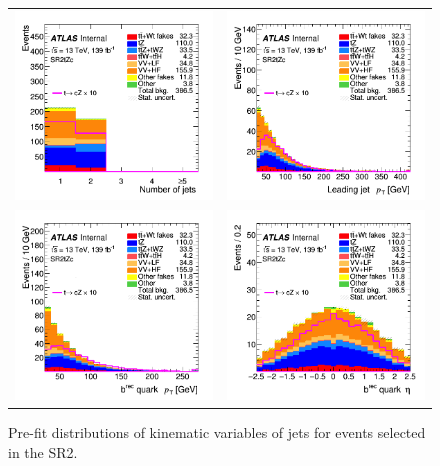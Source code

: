\begin{figure}[]
	\centering
	\begin{tabular}{cc}
		\includegraphics[width=.35\textwidth]{Appendices/AP6/figures/SR2/nJets} &
		\includegraphics[width=.35\textwidth]{Appendices/AP6/figures/SR2/jet_pt} \\
		\includegraphics[width=.35\textwidth]{Appendices/AP6/figures/SR2/b_pt} & 
		\includegraphics[width=.35\textwidth]{Appendices/AP6/figures/SR2/b_eta} \\
	\end{tabular}
	\caption{Pre-fit distributions of kinematic variables of jets for events selected in the SR2\tZc.
		\ErrStatOnly
		\Blinded
	}%
	\label{fig:sel:sr2:jets}
\end{figure}


